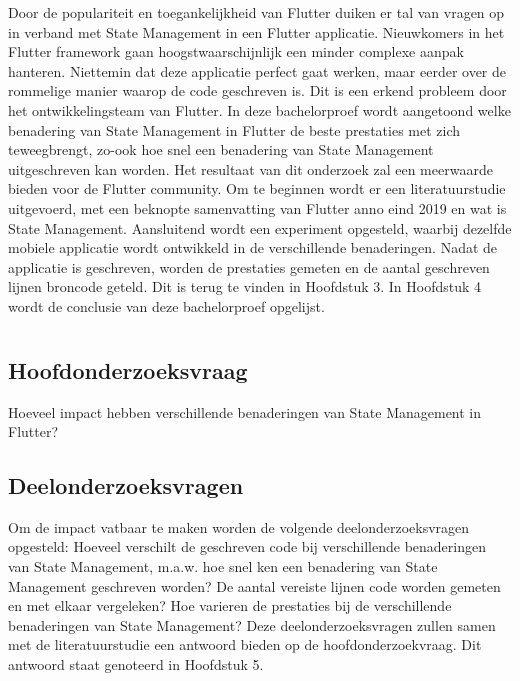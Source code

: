 Door de populariteit en toegankelijkheid van Flutter duiken er tal van vragen op in verband met State Management in een Flutter applicatie. Nieuwkomers in het Flutter framework gaan hoogstwaarschijnlijk een minder complexe aanpak hanteren. Niettemin dat deze applicatie perfect gaat werken, maar eerder over de rommelige manier waarop de code geschreven is. Dit is een erkend probleem door het ontwikkelingsteam van Flutter.
\newline
In deze bachelorproef wordt aangetoond welke benadering van State Management in Flutter de beste prestaties met zich teweegbrengt, zo-ook hoe snel een benadering van State Management uitgeschreven kan worden. Het resultaat van dit onderzoek zal een meerwaarde bieden voor de Flutter community. Om te beginnen wordt er een literatuurstudie uitgevoerd, met een beknopte samenvatting van Flutter anno eind 2019 en wat is State Management. Aansluitend wordt een experiment opgesteld, waarbij dezelfde mobiele applicatie wordt ontwikkeld in de verschillende benaderingen. Nadat de applicatie is geschreven, worden de prestaties gemeten en de aantal geschreven lijnen broncode geteld. Dit is terug te vinden in Hoofdstuk 3.
\newline
In Hoofdstuk 4 wordt de conclusie van deze bachelorproef opgelijst.

\section{}
\label{sec:onderzoeksvraag}

\subsection{Hoofdonderzoeksvraag}
Hoeveel impact hebben verschillende benaderingen van State Management in Flutter?

\subsection{Deelonderzoeksvragen}
Om de impact vatbaar te maken worden de volgende deelonderzoeksvragen opgesteld:
Hoeveel verschilt de geschreven code bij verschillende benaderingen van State Management, m.a.w.
hoe snel ken een benadering van State Management geschreven worden? De aantal vereiste lijnen code
worden gemeten en met elkaar vergeleken?
Hoe varieren de prestaties bij de verschillende benaderingen van State Management?
\newline
Deze deelonderzoeksvragen zullen samen met de literatuurstudie een antwoord bieden op de hoofdonderzoekvraag. Dit antwoord staat genoteerd in Hoofdstuk 5.

